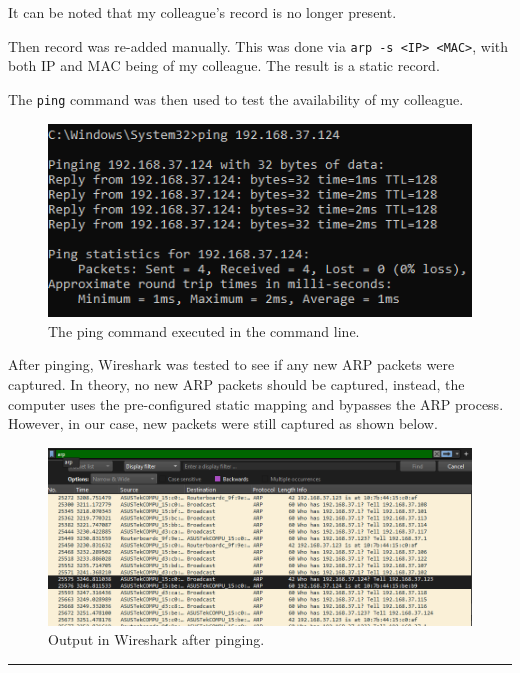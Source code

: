 \documentclass[a4paper,12pt]{article}
\begin{document}
It can be noted that my colleague's record is no longer present.

Then record was re-added manually.
This was done via \texttt{arp -s <IP> <MAC>}, with both IP and MAC being of my colleague. The result is a static record.

The \texttt{ping} command was then used to test the availability of my colleague.

\begin{figure}[H]
\centering
\includegraphics[width=\linewidth, height=0.16\textheight, keepaspectratio]{Pictures_Lab1/ping cmd.png}
\caption{The ping command executed in the command line.}
\end{figure}

After pinging, Wireshark was tested to see if any new ARP packets were captured. In theory, no new ARP packets should be captured, instead, the computer uses the pre-configured static mapping and bypasses the ARP process.
However, in our case, new packets were still captured as shown below. 
\begin{figure}[H]
\centering
\includegraphics[width=\linewidth,keepaspectratio]{Pictures_Lab1/new arp generated anyway objective 3 .png}
\caption{Output in Wireshark after pinging.}
\end{figure}

\vspace{1em}
\hrule
\vspace{0.5em}
\pagebreak
\end{document}
